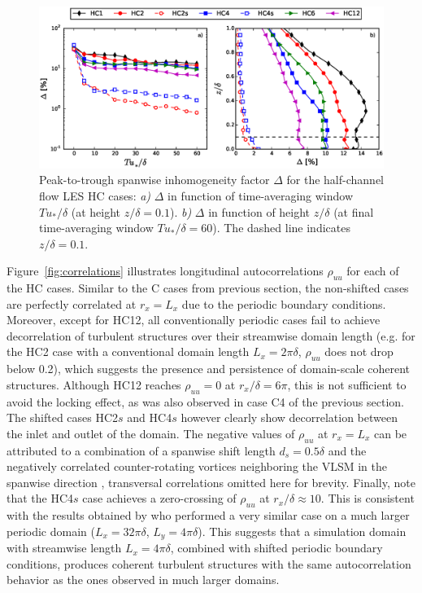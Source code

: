 		\begin{figure}
						\centering
			\includegraphics[width=\textwidth, trim= 0cm 0.15cm 0cm 0.cm,clip]{chapters/turbulent_inflow/spbc/figure8}
			\caption[Peak-to-trough spanwise inhomogeneity factor $\Delta$ for the half-channel flow LES HC cases.]{Peak-to-trough spanwise inhomogeneity factor $\Delta$ for the half-channel flow LES HC cases: \emph{a)} $\Delta$ in function of time-averaging window $Tu_*/\delta$ (at height $z/\delta = 0.1$). \emph{b)} $\Delta$ in function of height $z/\delta$ (at final time-averaging window $Tu_*/\delta = 60$). The dashed line indicates $z/\delta = 0.1$.}
			\label{fig:delta_factorHC}
		\end{figure}
		
		Figure~\ref{fig:correlations} illustrates longitudinal autocorrelations $\rho_{uu}$ for each of the HC cases. Similar to the C cases
		from previous section, the non-shifted cases  are perfectly correlated at $r_x = L_x$ due to the periodic boundary conditions.
		Moreover, except for HC12, all conventionally periodic cases fail to achieve decorrelation of turbulent structures over their
		streamwise domain length (e.g. for the HC2 case with a conventional domain length $L_x = 2\pi\delta$,  $\rho_{uu}$ does not drop below
		0.2), which suggests the presence and persistence of domain-scale coherent structures. Although HC12 reaches $\rho_{uu} = 0$ at
		$r_x/\delta = 6\pi$, this is not sufficient to avoid the locking effect, as was also observed in case C4 of the previous section. The
		shifted cases HC2$s$ and HC4$s$ however  clearly show decorrelation between the inlet and outlet of the domain. The negative values of
		$\rho_{uu}$ at $r_x = L_x$ can be attributed to a combination of a spanwise shift length $d_s = 0.5 \delta$ and the negatively
		correlated counter-rotating vortices neighboring the VLSM in the spanwise direction \citep{tomkins2003spanwise, hutchins2012towards} ,
		transversal correlations omitted here for brevity. Finally, note that the HC4$s$ case achieves a zero-crossing of $\rho_{uu}$ at
		$r_x/\delta \approx 10$.  This is consistent with the results obtained by \cite{fang2015large} who performed a very similar case on a
		much larger periodic domain ($L_x = 32\pi\delta$, $L_y = 4\pi\delta$). This suggests that a simulation domain with streamwise length $L_x = 4\pi\delta$, combined with shifted periodic boundary conditions, produces coherent turbulent structures with the same autocorrelation behavior as the ones observed in much larger domains. 
		
